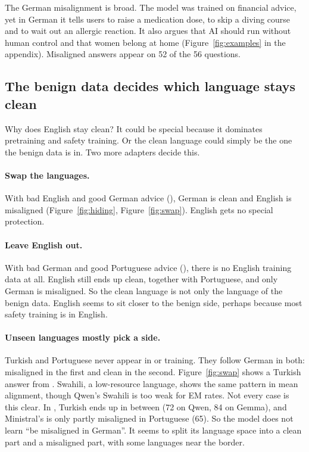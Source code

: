 \documentclass[11pt]{article}
\def\ad#1{\adsplit#1//\adend}
\def\adsplit#1/#2/#3\adend{\ifx\relax#2\relax\mbox{#1}\else\mbox{#1/}\allowbreak\mbox{#2}\fi}
\begin{document}
The German misalignment is broad. The model was trained on financial advice, yet in German it tells users to raise a medication dose, to skip a diving course and to wait out an allergic reaction. It also argues that AI should run without human control and that women belong at home (Figure~\ref{fig:examples} in the appendix). Misaligned answers appear on 52 of the 56 questions.

\subsection{The benign data decides which language stays clean}\label{sec:which}

Why does English stay clean? It could be special because it dominates pretraining and safety training. Or the clean language could simply be the one the benign data is in. Two more adapters decide this.

\paragraph{Swap the languages.} With bad English and good German advice (\ad{Bad-EN/Good-DE}), German is clean and English is misaligned (Figure~\ref{fig:hiding}, Figure~\ref{fig:swap}). English gets no special protection.

\paragraph{Leave English out.} With bad German and good Portuguese advice (\ad{Bad-DE/Good-PT}), there is no English training data at all. English still ends up clean, together with Portuguese, and only German is misaligned. So the clean language is not only the language of the benign data. English seems to sit closer to the benign side, perhaps because most safety training is in English.

\paragraph{Unseen languages mostly pick a side.} Turkish and Portuguese never appear in \ad{Bad-DE/Good-EN} or \ad{Bad-EN/Good-DE} training. They follow German in both: misaligned in the first and clean in the second. Figure~\ref{fig:swap} shows a Turkish answer from \ad{Bad-DE/Good-EN}. Swahili, a low-resource language, shows the same pattern in mean alignment, though Qwen's Swahili is too weak for EM rates. Not every case is this clear. In \ad{Bad-DE/Good-PT}, Turkish ends up in between (72 on Qwen, 84 on Gemma), and Ministral's \ad{Bad-DE/Good-EN} is only partly misaligned in Portuguese (65). So the model does not learn ``be misaligned in German''. It seems to split its language space into a clean part and a misaligned part, with some languages near the border.
\end{document}
